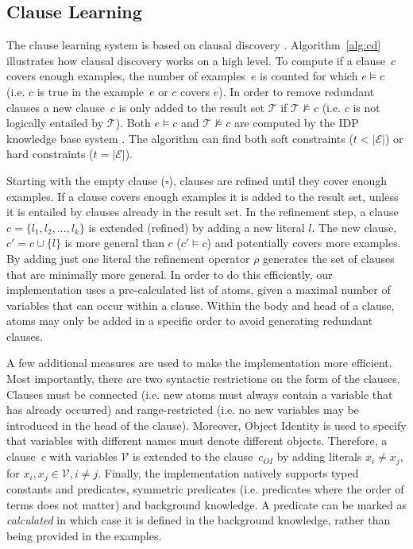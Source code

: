 \documentclass[letterpaper]{article}
\newcommand{\sym}[1]{\ensuremath{\mathcal{#1}}}
\theoremstyle{definition}
\newcommand{\abs}[1]{\left|#1\right|}
\begin{document}
\subsection{Clause Learning}
The clause learning system is based on clausal discovery \cite{DeRaedt:ClausalDiscovery}.
Algorithm~\ref{alg:cd} illustrates how clausal discovery works on a high level.
To compute if a clause~$c$ covers enough examples, the number of examples~$e$ is counted for which $e \models c$ (i.e. $c$ is true in the example~$e$ or $c$ covers $e$).
In order to remove redundant clauses a new clause~$c$ is only added to the result set $\sym{T}$ if $\sym{T} \not\models c$ (i.e. $c$ is not logically entailed by \sym{T}).
Both $e \models c$ and $\sym{T} \not\models c$ are computed by the IDP knowledge base system \cite{de2013prototype,wittocx2008idp}.
The algorithm can find both soft constraints ($t < \abs{\sym{E}}$) or hard constraints ($t = \abs{\sym{E}}$).

Starting with the empty clause ($\square$), clauses are refined until they cover enough examples.
If a clause covers enough examples it is added to the result set, unless it is entailed by clauses already in the result set.
In the refinement step, a clause $c = \{l_1, l_2, ..., l_k\}$ is extended (refined) by adding a new literal $l$.
The new clause, $c' = c \cup \{l\}$ is more general than $c$ ($c' \models c$) and potentially covers more examples.
By adding just one literal the refinement operator $\rho$ generates the set of clauses that are minimally more general.
In order to do this efficiently, our implementation uses a pre-calculated list of atoms, given a maximal number of variables that can occur within a clause.
Within the body and head of a clause, atoms may only be added in a specific order to avoid generating redundant clauses.

A few additional measures are used to make the implementation more efficient.
Most importantly, there are two syntactic restrictions on the form of the clauses.
Clauses must be connected (i.e. new atoms must always contain a variable that has already occurred) and range-restricted (i.e. no new variables may be introduced in the head of the clause).
Moreover, Object Identity is used to specify that variables with different names must denote different objects.
Therefore, a clause~$c$ with variables \sym{V} is extended to the clause~$c_{OI}$ by adding literals $x_i \neq x_j$, for $x_i, x_j \in \sym{V}, i \neq j$.
Finally, the implementation natively supports typed constants and predicates, symmetric predicates (i.e. predicates where the order of terms does not matter) and background knowledge.
A predicate can be marked as \emph{calculated} in which case it is defined in the background knowledge, rather than being provided in the examples. 
\end{document}
